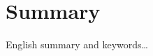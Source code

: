 \documentclass[12pt,maitrise,nobabel,anglais,twoside,initial]{template/dms}
\numberwithin{equation}{section}
\numberwithin{table}{chapter}
\numberwithin{figure}{chapter}
\begin{document}
\chapter*{Summary}

\noindent English summary and keywords\dots


\cleardoublepage
{}  %
\tableofcontents				%
\cleardoublepage
{}
\listoftables
\cleardoublepage
{}
\listoffigures	



\end{document}
